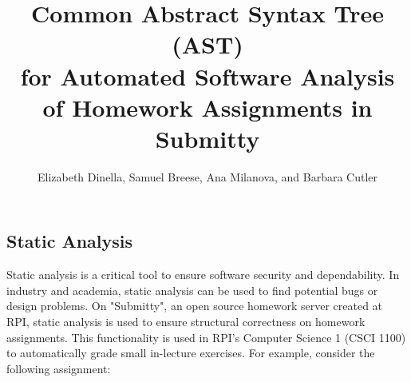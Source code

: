 \documentclass[thesis]{hmcposter}
\title{Common Abstract Syntax Tree (AST) \\ for Automated Software Analysis \\ of Homework Assignments in Submitty}
\author{Elizabeth Dinella, Samuel Breese, Ana Milanova, and Barbara Cutler}
\begin{document}
\begin{poster}

\section{Static Analysis}
Static analysis is a critical tool to ensure software security and dependability. In industry and academia, static analysis can be used to find potential bugs or design problems. On "Submitty", an open source homework server created at RPI, static analysis is used to ensure structural correctness on homework assignments. This functionality is used in RPI's Computer Science 1 (CSCI 1100) to automatically grade small in-lecture exercises. %
For example, consider the following assignment:


\begin{figure}
\begin{center}
\end{center}
\end{figure}


\end{poster}
\end{document}
